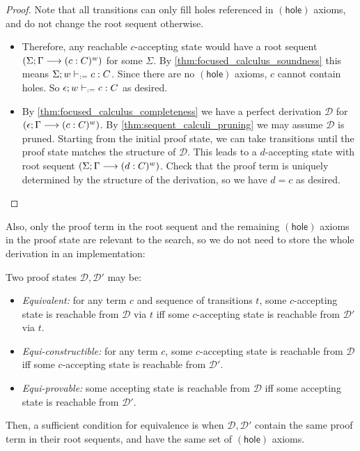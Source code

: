 \documentclass[twoside]{report}
\begin{document}
\begin{proof}
    Note that all transitions can only fill holes referenced in $(\mathsf{hole})$ axioms, and do not change the root sequent otherwise.
    \begin{itemize}
        \item Therefore, any reachable $c$-accepting state would have a root sequent $(\Sigma; \Gamma \longrightarrow (c : C)^w)$ for some $\Sigma$. By \cref{thm:focused_calculus_soundness} this means $\Sigma; w \vdash_{:=} c : C$. Since there are no $(\mathsf{hole})$ axioms, $c$ cannot contain holes. So $\epsilon; w \vdash_{:=} c : C$ as desired.

        \item By \cref{thm:focused_calculus_completeness} we have a perfect derivation $\mathcal D$ for $(\epsilon; \Gamma \longrightarrow (c : C)^w)$. By \cref{thm:sequent_calculi_pruning} we may assume $\mathcal D$ is pruned. Starting from the initial proof state, we can take transitions until the proof state matches the structure of $\mathcal D$. This leads to a $d$-accepting state with root sequent $(\Sigma; \Gamma \longrightarrow (d : C)^w)$. Check that the proof term is uniquely determined by the structure of the derivation, so we have $d = c$ as desired. \qedhere
    \end{itemize}
\end{proof}

Also, only the proof term in the root sequent and the remaining $(\mathsf{hole})$ axioms in the proof state are relevant to the search, so we do not need to store the whole derivation in an implementation:

\begin{proposition}
    \label{thm:tableau_states_equivalence}
    Two proof states $\mathcal D, \mathcal D'$ may be:
    \begin{itemize}
        \item \emph{Equivalent:} for any term $c$ and sequence of transitions $t$, some $c$-accepting state is reachable from $\mathcal D$ via $t$ iff some $c$-accepting state is reachable from $\mathcal D'$ via $t$.

        \item \emph{Equi-constructible:} for any term $c$, some $c$-accepting state is reachable from $\mathcal D$ iff some $c$-accepting state is reachable from $\mathcal D'$.

        \item \emph{Equi-provable:} some accepting state is reachable from $\mathcal D$ iff some accepting state is reachable from $\mathcal D'$.
    \end{itemize}
    Then, a sufficient condition for equivalence is when $\mathcal D, \mathcal D'$ contain the same proof term in their root sequents, and have the same set of $(\mathsf{hole})$ axioms.
\end{proposition}
\end{document}
